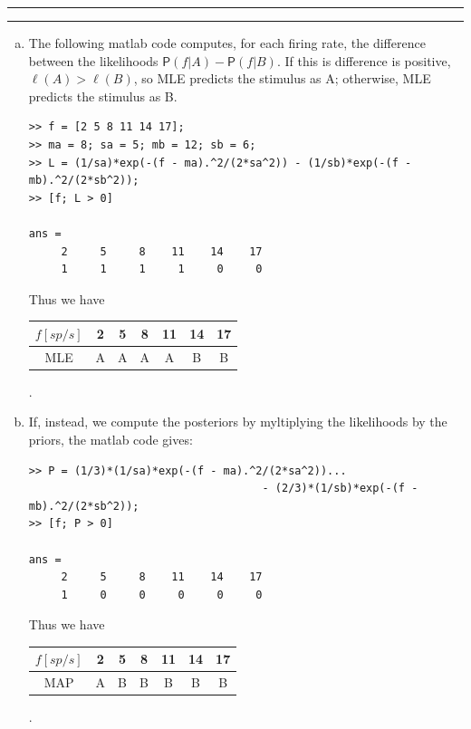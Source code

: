\documentclass[11pt]{article}
\newcounter{questionCounter}
\newcounter{partCounter}[questionCounter]
\newenvironment{question}[2][\arabic{questionCounter}]{%
    \setcounter{partCounter}{0}%
    \vspace{.25in} \hrule \vspace{0.5em}%
        \noindent{\bf #2}%
    \vspace{0.8em} \hrule \vspace{.10in}%
    \addtocounter{questionCounter}{1}%
}{}
\newcommand{\pr}[1]{\mathsf{P}\left( #1 \right)} %
\begin{document}
\begin{question}{Problem 2}
\begin{enumerate}[a.]
\item The following matlab code computes, for each firing rate, the difference
between the likelihoods $\pr{f | A} - \pr{f | B}$. If this is difference is
positive, $\ell(A) > \ell(B)$, so MLE predicts the stimulus as A;
otherwise, MLE predicts the stimulus as B.
\begin{verbatim}
>> f = [2 5 8 11 14 17];
>> ma = 8; sa = 5; mb = 12; sb = 6;
>> L = (1/sa)*exp(-(f - ma).^2/(2*sa^2)) - (1/sb)*exp(-(f - mb).^2/(2*sb^2));
>> [f; L > 0]

ans =
     2     5     8    11    14    17
     1     1     1     1     0     0
\end{verbatim}
Thus we have
\begin{center}
\begin{tabular}{|c|c|c|c|c|c|c|}
\hline
$f [sp/s]$ & 2 & 5 & 8 & 11 & 14 & 17 \\
\hline
 MLE       & A & A & A &  A &  B &  B \\
\hline
\end{tabular}.
\end{center}

\item If, instead, we compute the posteriors by myltiplying the likelihoods by
the priors, the matlab code gives:
\begin{verbatim}
>> P = (1/3)*(1/sa)*exp(-(f - ma).^2/(2*sa^2))...
                                    - (2/3)*(1/sb)*exp(-(f - mb).^2/(2*sb^2));
>> [f; P > 0]

ans =
     2     5     8    11    14    17
     1     0     0     0     0     0
\end{verbatim}
Thus we have
\begin{center}
\begin{tabular}{|c|c|c|c|c|c|c|}
\hline
$f [sp/s]$ & 2 & 5 & 8 & 11 & 14 & 17 \\
\hline
 MAP       & A & B & B &  B &  B &  B \\
\hline
\end{tabular}.
\end{center}

\end{enumerate}
\end{question}
\end{document}
